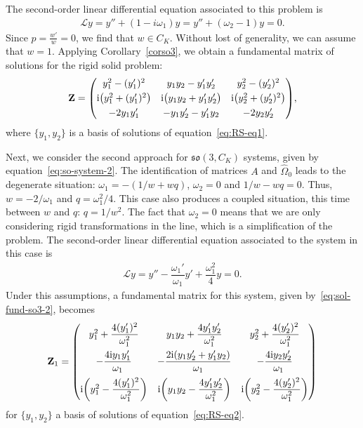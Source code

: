 \documentclass[10pt,a4paper]{amsart}
\numberwithin{equation}{section}
\begin{document}
The second-order linear differential equation associated to this problem is
\begin{gather}\label{eq:RS-eq1}
 \mathcal{L} y = y'' + (1- i\omega_1)y = y'' + (\omega_2 -1)y = 0.
\end{gather}
Since $p= \frac{w'}{w} = 0$, we find that $w \in C_K$. Without lost of generality, we can assume that $w=1$. Applying Corollary~\ref{corso3}, we obtain a fundamental matrix of solutions for the rigid solid problem:
\begin{gather*}
\mathbf{Z} = \begin{pmatrix}
y_1^2 - (y_1')^2 & y_1 y_2 - y_1' y_2' & y_2^2 -(y_2')^{2} \\[3pt]
{\rm i} \big(y_1^2 + (y_1')^{2}\big) & {\rm i} \big(y_1 y_2 + y_1' y_2'\big) &
{\rm i} \big(y_2^2 + (y_2')^{2}\big) \\[3pt] -2y_1 y_1' & - y_1 y_2' - y_1' y_2 & -2 y_2 y_2' \end{pmatrix}\!,
\end{gather*}
where $\{ y_1, y_2 \}$ is a basis of solutions of equation~\eqref{eq:RS-eq1}.

Next, we consider the second approach for $\mathfrak{so}(3, C_K)$ systems, given by equation~\eqref{eq:so-system-2}. The identification of matrices $A$ and $\widehat{\Omega}_0$ leads to the degenerate situation: $\omega_1 = - (1/w + wq)$, $\omega_2 = 0$ and $1/w - wq =0$. Thus, $w = -2/ \omega_1$ and $q = \omega_1^2 /4$. This case also produces a coupled situation, this time between $w$ and $q$: $q = 1/w^2$. The fact that $\omega_2 = 0$ means that we are only considering rigid transformations in the line, which is a simplification of the problem. The second-order linear differential equation associated to the system in this case is
\begin{gather}\label{eq:RS-eq2}
 \mathcal{L} y = y'' - \dfrac{\omega_1'}{\omega_1} y' +\dfrac{\omega_1^2}{4}y =0.
\end{gather}
Under this assumptions, a fundamental matrix for this system, given by~\eqref{eq:sol-fund-so3-2}, becomes
\begin{gather*}
\mathbf{Z}_1 = \begin{pmatrix}
 y_1^2 + \dfrac{4 (y_1')^2}{\omega_1^2} & y_1 y_2 + \dfrac{4 y_1' y_2'}{\omega_1^2} & y_2^2 + \dfrac{4 (y_2')^2}{\omega_1^2} \\[10pt]
 - \dfrac{4{\rm i} y_1 y_1'}{\omega_1} & -\dfrac{2{\rm i} (y_1 y_2' + y_1' y_2)}{\omega_1} & - \dfrac{4{\rm i} y_2 y_2'}{\omega_1} \\[10pt]
 {\rm i}\bigg (y_1^2 - \dfrac{4 (y_1')^2}{\omega_1^2} \bigg ) & {\rm i} \bigg (y_1 y_2 - \dfrac{4 y_1' y_2'}{\omega_1^2} \bigg ) & {\rm i}\bigg (y_2^2 - \dfrac{4 (y_2')^2}{\omega_1^2} \bigg )
\end{pmatrix}
\end{gather*}
for $\{ y_1, y_2\}$ a basis of solutions of equation~\eqref{eq:RS-eq2}.
\end{document}
